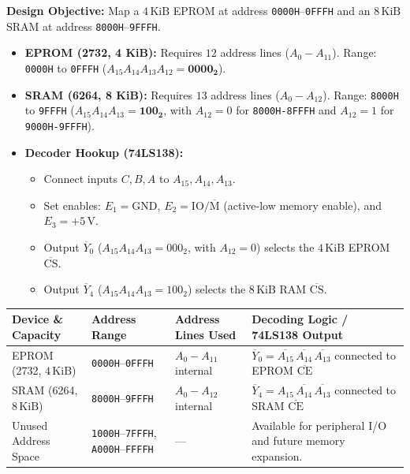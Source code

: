 \documentclass[12pt,a4paper]{article}
\begin{document}
\begin{tcolorbox}[examplebox, title={Interfacing 4 KiB EPROM (2732) and 8 KiB RAM (6264)}]
\textbf{Design Objective:} Map a $4\,\mathrm{KiB}$ EPROM at address \texttt{0000H}--\texttt{0FFFH} and an $8\,\mathrm{KiB}$ SRAM at address \texttt{8000H}--\texttt{9FFFH}.
\par\vspace{4pt}
\begin{itemize}[leftmargin=*]
  \item \textbf{EPROM (2732, 4 KiB):} Requires $12$ address lines ($A_0-A_{11}$). Range: \texttt{0000H} to \texttt{0FFFH} ($A_{15}A_{14}A_{13}A_{12} = \mathbf{0000_2}$).
  \item \textbf{SRAM (6264, 8 KiB):} Requires $13$ address lines ($A_0-A_{12}$). Range: \texttt{8000H} to \texttt{9FFFH} ($A_{15}A_{14}A_{13} = \mathbf{100_2}$, with $A_{12}=0$ for \texttt{8000H-8FFFH} and $A_{12}=1$ for \texttt{9000H-9FFFH}).
  \item \textbf{Decoder Hookup (74LS138):}
  \begin{itemize}[leftmargin=*]
    \item Connect inputs $C, B, A$ to $A_{15}, A_{14}, A_{13}$.
    \item Set enables: $E_1 = \mathrm{GND}$, $E_2 = \mathrm{IO}/\overline{\mathrm{M}}$ (active-low memory enable), and $E_3 = +5\,\mathrm{V}$.
    \item Output $\overline{Y}_0$ ($A_{15}A_{14}A_{13} = 000_2$, with $A_{12}=0$) selects the $4\,\mathrm{KiB}$ EPROM $\overline{\mathrm{CS}}$.
    \item Output $\overline{Y}_4$ ($A_{15}A_{14}A_{13} = 100_2$) selects the $8\,\mathrm{KiB}$ RAM $\overline{\mathrm{CS}}$.
  \end{itemize}
\end{itemize}
\end{tcolorbox}

\par\vspace{6pt}\noindent
\begingroup
\setlength{\extrarowheight}{2.5pt}
\noindent\begin{tabularx}{\linewidth}{|B{3.2cm}|B{2.5cm}|B{2.5cm}|Y|}
\hline
\textbf{Device \& Capacity} & \textbf{Address Range} & \textbf{Address Lines Used} & \textbf{Decoding Logic / 74LS138 Output} \\ \hline
EPROM (2732, $4\,\mathrm{KiB}$) & \texttt{0000H}--\texttt{0FFFH} & $A_0-A_{11}$ internal & $\overline{Y}_0 = \overline{A_{15}}\,\overline{A_{14}}\,\overline{A_{13}}$ connected to EPROM $\overline{\mathrm{CE}}$ \\ \hline
SRAM (6264, $8\,\mathrm{KiB}$) & \texttt{8000H}--\texttt{9FFFH} & $A_0-A_{12}$ internal & $\overline{Y}_4 = A_{15}\,\overline{A_{14}}\,\overline{A_{13}}$ connected to SRAM $\overline{\mathrm{CE}}$ \\ \hline
Unused Address Space & \texttt{1000H}--\texttt{7FFFH}, \texttt{A000H}--\texttt{FFFFH} & --- & Available for peripheral I/O and future memory expansion. \\ \hline
\end{tabularx}\par
\endgroup
\end{document}
